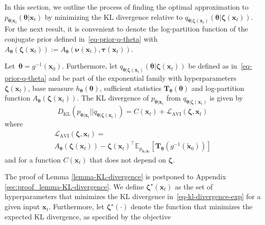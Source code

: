 In this section, we outline the process of finding the optimal approximation to $p_{\boldsymbol{\theta}|\mathbf{x}_t}(\boldsymbol{\theta}|\mathbf{x}_{t})$ by minimizing the KL divergence relative to $q_{\boldsymbol{\theta}\vert \boldsymbol{\zeta}(\mathbf{x}_t)}(\boldsymbol{\theta}\vert \boldsymbol{\zeta}(\mathbf{x}_t))$. For the next result, it is convenient to denote the log-partition function of the conjugate prior defined in~\eqref{eq-prior-q-theta} with $A_{\boldsymbol{\theta}}(\boldsymbol{\zeta}(\mathbf{x}_t)) := A_{\boldsymbol{\theta}}(\boldsymbol{\nu}(\mathbf{x}_t), \boldsymbol{\tau}(\mathbf{x}_t))$.
\begin{lemma}
\label{lemma-KL-divergence}
Let~$\boldsymbol{\theta} = g^{-1}(\mathbf{x}_0)$.
Furthermore, let
$q_{\boldsymbol{\theta}\vert \boldsymbol{\zeta}(\mathbf{x}_t)}(\boldsymbol{\theta}\vert \boldsymbol{\zeta}(\mathbf{x}_t))$ be defined as in~\eqref{eq-prior-q-theta} and be part of the exponential family with
hyperparameters $\boldsymbol{\zeta}(\mathbf{x}_t)$, base measure $h_{\boldsymbol{\theta}}(\boldsymbol{\theta})$, sufficient statistics $\mathbf{T}_{\boldsymbol{\theta}}(\boldsymbol{\theta})$ and
log-partition function $A_{\boldsymbol{\theta}}(\boldsymbol{\zeta}(\mathbf{x}_t))$.  
The KL divergence of $p_{\boldsymbol{\theta}\vert \mathbf{x}_t}$ from $q_{\boldsymbol{\theta}\vert \boldsymbol{\zeta}(\mathbf{x}_t)}$ is given by
\begin{equation}
\label{eq-kl-divergence-exp}
    D_{\text{KL}}(p_{\boldsymbol{\theta}\vert \mathbf{x}_t} \vert\vert q_{\boldsymbol{\theta}\vert \boldsymbol{\zeta}(\mathbf{x}_t)}) =  C(\mathbf{x}_t)  +\mathcal{L}_{\text{AVI}}(\boldsymbol{\zeta}, \mathbf{x}_t)
\end{equation}
where 
\begin{multline*}
\mathcal{L}_{\text{AVI}}\left(\boldsymbol{\zeta},\mathbf{x}_t\right) =\\  A_{\boldsymbol{\theta}}(\boldsymbol{\zeta}(\mathbf{x}_t)) -\boldsymbol{\zeta}(\mathbf{x}_t)^{\top}\mathbb{E}_{p_{\tilde{\mathbf{x}}_{0}\vert\mathbf{x}_t}}[\mathbf{T}_{\boldsymbol{\theta}}(g^{-1}(\tilde{\mathbf{x}}_{0}))]
\end{multline*}
and for a function $C(\mathbf{x}_t)$ that does not depend on $\boldsymbol{\zeta}$.
\end{lemma}
The proof of Lemma \ref{lemma-KL-divergence} is postponed to Appendix \ref{sec:proof_lemma-KL-divergence}.
We define $\boldsymbol{\zeta}^{\star}(\mathbf{x}_t)$ as the set of hyperparameters that minimizes the KL divergence in~\eqref{eq-kl-divergence-exp} for a given input $\mathbf{x}_t$. Furthermore, let  $\boldsymbol{\zeta}^{\star}(\cdot)$ denote the function that minimizes the expected KL divergence, as specified by the objective
